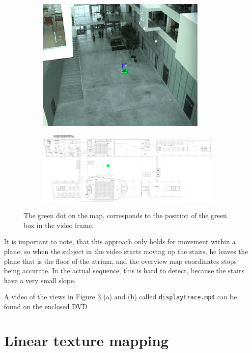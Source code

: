 \documentclass[a4paper,11pt]{article}
\begin{document}
\begin{figure}[H]
\centering
\begin{subfigure}{.4\textwidth}
  \centering
  \includegraphics[width=0.8\linewidth]{groundfloorboxes}
  \caption{}
  \label{fig:persontracking1}
\end{subfigure}
\begin{subfigure}{1\textwidth}
  \centering
  \includegraphics[width=0.8\linewidth]{maplocation}
  \caption{}
  \label{fig:persontracking2}
\end{subfigure}
\caption{The green dot on the map, corresponds to the position of the green box in the video frame.}
\label{fig:persontracking}
\end{figure}


It is important to note, that this approach only holds for movement within a plane, so when the subject in the video starts moving up the stairs, he leaves the plane that is the floor of the atrium, and the overview map coordinates stops being accurate. In the actual sequence, this is hard to detect, because the stairs have a very small slope.

A video of the views in Figure \ref{fig:persontracking} (a) and (b) called \texttt{displaytrace.mp4} can be found on the enclosed DVD

\section{Linear texture mapping}
\label{sec:linear}
\end{document}

